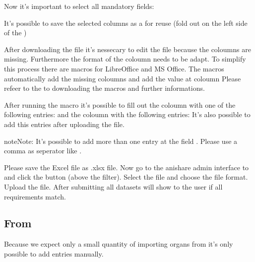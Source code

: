 \documentclass[letterpaper,10pt,openany,oneside,english]{sphinxmanual}
\begin{document}
Now it’s important to select all mandatory fields:

\noindent{}

It’s possible to save the selected columns as a  for reuse (fold out  on the left side of the )

After downloading the file it’s nessecary to edit the file because the coloumns  are missing.
Furthermore the format of the coloumn  needs to be adapt.
To simplify this process there are macros for LibreOffice and MS Office. The macros automatically add the missing coloumns and add the value
 at coloumn 
Please refeer to the  to downloading the macros and further informations.

After running the macro it’s possible to fill out the coloumn  with one of the following entries:
 and
the coloumn  with the following entries:
It’s also possible to add this entries after uploading the file.

\begin{sphinxadmonition}{note}{Note:}
It’s possible to add more than one entry at the field . Please use a comma as seperator like .
\end{sphinxadmonition}

Please save the Excel file as .xlsx file. Now go to the anishare admin interface to 
and click the button  (above the filter). Select the file and choose the file format. Upload the file. After submitting all datasets will show to
the user if all requirements match.


\subsection{From }
\label{\detokenize{index:id2}}
Because we expect only a small quantity of importing organs from  it’s only possible to add entries manually.
\end{document}
